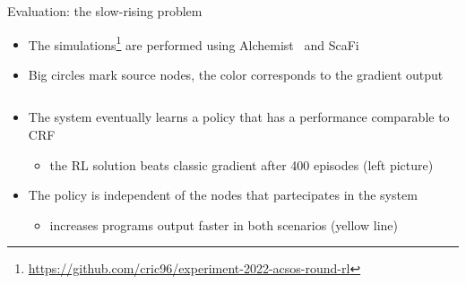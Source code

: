 \documentclass[8pt, aspectratio=169, handout]{beamer}
\begin{document}
\begin{frame}{Evaluation: the slow-rising problem}
\begin{card}
\begin{itemize}
      \item The simulations\footnote{\url{https://github.com/cric96/experiment-2022-acsos-round-rl}} are performed using Alchemist~\cite{alchemist-jos2013} and ScaFi~\cite{DBLP:conf/isola/CasadeiVAD20} 
      \item Big circles mark source nodes, the color corresponds to the gradient output
    \end{itemize}
  \end{card}  
  \begin{columns}
    \begin{column}{0.3\textwidth}
    \end{column}
    \begin{column}{0.38\textwidth}
    \end{column}  
  \end{columns}
  \begin{card}[Results]
    \begin{itemize}
      \item The system eventually learns a policy that has a performance comparable to CRF
      \begin{itemize}
        \item the RL solution beats classic gradient after 400 episodes (left picture)
      \end{itemize}
      \item The policy is independent of the nodes that partecipates in the system
      \begin{itemize}
        \item increases programs output faster in both scenarios (yellow line)
      \end{itemize}
    \end{itemize}
  \end{card}
  \begin{multicols}{3}
  \end{multicols}
\end{frame}
\end{document}
